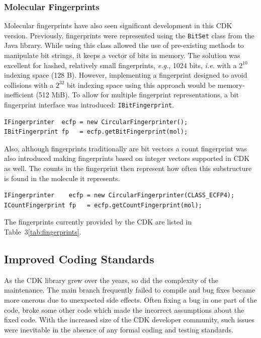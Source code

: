 \documentclass[10pt]{bmcart}
\begin{document}
\subsubsection*{Molecular Fingerprints}
Molecular fingerprints have also seen significant development in this CDK version.
Previously, fingerprints were represented using the \texttt{BitSet} class from
the Java library. While using this class
allowed the use of pre-existing methods to manipulate bit strings, it
keeps a vector of bits in memory. The solution was excellent for
hashed, relatively small fingerprints, \textit{e.g.}, 1024 bits,
\textit{i.e.} with a $2^{10}$ indexing space (128 B). However, implementing a
fingerprint designed to avoid collisions with a $2^{32}$ bit
indexing space using this approach would be memory-inefficient (512 MiB).
To allow for multiple fingerprint representations, a bit
fingerprint interface was introduced: \texttt{IBitFingerprint}.

\vspace{0.2cm}
\begin{verbatim}
IFingerprinter  ecfp = new CircularFingerprinter();
IBitFingerprint fp   = ecfp.getBitFingerprint(mol);
\end{verbatim}
\vspace{0.2cm}

Also, although fingerprints traditionally are bit vectors a count
fingerprint was also introduced making fingerprints based on integer
vectors supported in CDK as well. The counts in the fingerprint then 
represent how often this substructure is found in the molecule it
represents.

\vspace{0.2cm}
\begin{verbatim}
IFingerprinter    ecfp = new CircularFingerprinter(CLASS_ECFP4);
ICountFingerprint fp   = ecfp.getCountFingerprint(mol);
\end{verbatim}
\vspace{0.2cm}

The fingerprints currently provided by the CDK are listed in Table~3\ref{tab:fingerprints}.

\subsection*{Improved Coding Standards}

As the CDK library grew over the years, so did the complexity of the
maintenance. The main branch frequently failed to compile and bug
fixes became more onerous due to unexpected side effects.  Often
fixing a bug in one part of the code, broke some other code which made
the incorrect assumptions about the fixed code. With the increased size of
the CDK developer community, such issues were inevitable in the
absence of any formal coding and testing standards.
\end{document}
